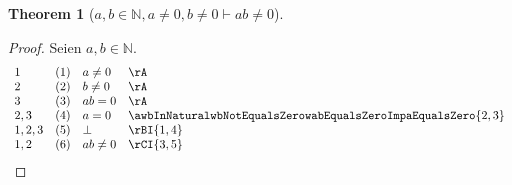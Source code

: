 \documentclass{book}
\theoremstyle{plain}
\newtheorem{theorem}{Theorem}
\theoremstyle{remark}
\theoremstyle{definition}
\begin{document}
\label{awbInNaturalwaNotEqualsZerowbNotEqualsZeroImpabNotEqualsZero}
\begin{theorem}[\(a,b\in\mathbb{N},a\neq 0,b\neq 0\vdash ab\neq 0\)]
\end{theorem}
\begin{proof}
        Seien \(a,b\in\mathbb{N}\). 
        \[
	\begin{array}{llll}
            1       &  (1)  & a\neq 0 & \rA \\
            2       &  (2)  & b\neq 0 & \rA \\
            3       &  (3)  & ab=0 & \rA \\
            2,3     &  (4)  & a=0 & \awbInNaturalwbNotEqualsZerowabEqualsZeroImpaEqualsZero{2,3} \\
            1,2,3   &  (5)  & \bot & \rBI{1,4} \\
            1,2   &  (6)  & ab\neq 0 & \rCI{3,5} \\
	\end{array}
	\]
\end{proof}
\end{document}

